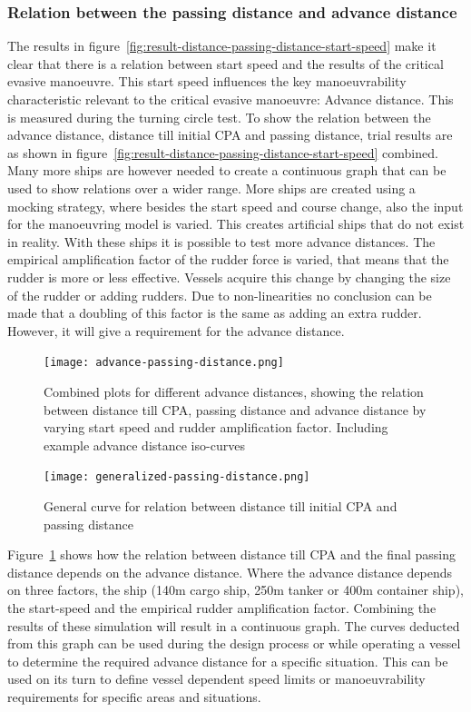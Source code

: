 \subsubsection{Relation between the passing distance and advance distance}
\label{sec:relation-advance-distance}
The results in figure~\ref{fig:result-distance-passing-distance-start-speed} make it clear that there is a relation between start speed and the results of the critical evasive manoeuvre. This start speed influences the key manoeuvrability characteristic relevant to the critical evasive manoeuvre: Advance distance. This is measured during the turning circle test. To show the relation between the advance distance, distance till initial CPA and passing distance, trial results are as shown in figure~\ref{fig:result-distance-passing-distance-start-speed} combined. Many more ships are however needed to create a continuous graph that can be used to show relations over a wider range. More ships are created using a mocking strategy, where besides the start speed and course change, also the input for the manoeuvring model is varied. This creates artificial ships that do not exist in reality. With these ships it is possible to test more advance distances. The empirical amplification factor of the rudder force is varied, that means that the rudder is more or less effective. Vessels acquire this change by changing the size of the rudder or adding rudders. Due to non-linearities no conclusion can be made that a doubling of this factor is the same as adding an extra rudder. However, it will give a requirement for the advance distance. 

\begin{figure}[p]
	\centering
	\texttt{[image: advance-passing-distance.png]}
	\caption{Combined plots for different advance distances, showing the relation between distance till CPA, passing distance and advance distance by varying start speed and rudder amplification factor. Including example advance distance iso-curves}
	\label{fig:passing-distance-advance}
\end{figure}

\begin{figure}[p]
	\centering
	\texttt{[image: generalized-passing-distance.png]}
	\caption{General curve for relation between distance till initial CPA and passing distance}
	\label{fig:general-advance-passing} 
\end{figure}

Figure~\ref{fig:passing-distance-advance} shows how the relation between distance till CPA and the final passing distance depends on the advance distance. Where the advance distance depends on three factors, the ship (140m cargo ship, 250m tanker or 400m container ship), the start-speed and the empirical rudder amplification factor. Combining the results of these simulation will result in a continuous graph. The curves deducted from this graph can be used during the design process or while operating a vessel to determine the required advance distance for a specific situation. This can be used on its turn to define vessel dependent speed limits or manoeuvrability requirements for specific areas and situations.

